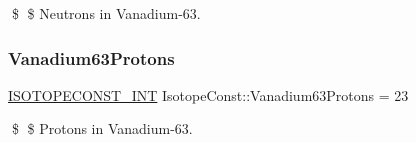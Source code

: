 \$ \$ Neutrons in Vanadium-\/63. \mbox{\label{group___isotope_const-_vanadium-_v63_gabee10ebabd3501184d843872010a82f8}} 
\subsubsection{\texorpdfstring{Vanadium63\+Protons}{Vanadium63Protons}}
{\footnotesize\ttfamily \mbox{\hyperlink{group___isotope_const-_macros_ga5f18360b3e99483a35c32d789e62621c}{I\+S\+O\+T\+O\+P\+E\+C\+O\+N\+S\+T\+\_\+\+I\+NT}} Isotope\+Const\+::\+Vanadium63\+Protons = 23}

\$ \$ Protons in Vanadium-\/63. 